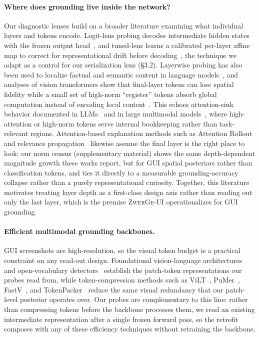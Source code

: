 \paragraph{Where does grounding live inside the network?}
Our diagnostic lenses build on a broader literature examining what individual layers and tokens encode. Logit-lens probing decodes intermediate hidden states with the frozen output head~\citep{nostalgebraist2020logitlens}, and tuned-lens learns a calibrated per-layer affine map to correct for representational drift before decoding~\citep{belrose2023tunedlens}, the technique we adapt as a control for our serialization lens (\S3.2). Layerwise probing has also been used to localize factual and semantic content in language models~\citep{geva2021transformer,meng2022locating}, and analyses of vision transformers show that final-layer tokens can lose spatial fidelity while a small set of high-norm ``register'' tokens absorb global computation instead of encoding local content~\citep{darcet2024registers,lan2024clearclip,chen2025rethinking}. This echoes attention-sink behavior documented in LLMs~\citep{xiao2023streamingllm} and in large multimodal models~\citep{kang2025visualsink}, where high-attention or high-norm tokens serve internal bookkeeping rather than task-relevant regions. Attention-based explanation methods such as Attention Rollout~\citep{abnar2020attentionflow} and relevance propagation~\citep{chefer2021transformer} likewise assume the final layer is the right place to look; our norm census (supplementary material) shows the same depth-dependent magnitude growth these works report, but for GUI spatial posteriors rather than classification tokens, and ties it directly to a measurable grounding-accuracy collapse rather than a purely representational curiosity. Together, this literature motivates treating layer depth as a first-class design axis rather than reading out only the last layer, which is the premise \textsc{ZwerGe-UI} operationalizes for GUI grounding.

\paragraph{Efficient multimodal grounding backbones.}
GUI screenshots are high-resolution, so the visual token budget is a practical constraint on any read-out design. Foundational vision-language architectures~\citep{dosovitskiy2021vit,radford2021clip,bai2023qwenvl,bai2025qwen25vl,qwen3vl} and open-vocabulary detectors~\citep{carion2020detr,kamath2021mdetr,li2022glip,liu2023groundingdino,minderer2022owlvit,kirillov2023sam} establish the patch-token representations our probes read from, while token-compression methods such as ViLT~\citep{kim2021vilt}, PuMer~\citep{cao2023pumer}, FastV~\citep{chen2024fastv}, and TokenPacker~\citep{li2024tokenpacker} reduce the same visual redundancy that our patch-level posterior operates over. Our probes are complementary to this line: rather than compressing tokens before the backbone processes them, we read an existing intermediate representation after a single frozen forward pass, so the retrofit composes with any of these efficiency techniques without retraining the backbone.
